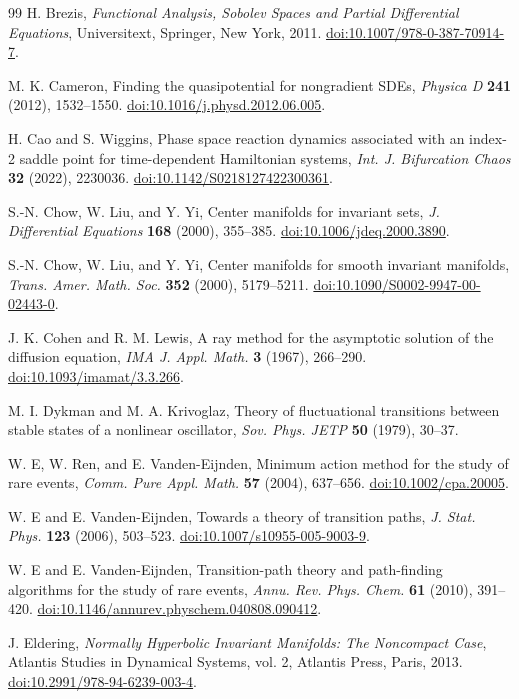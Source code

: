 \documentclass[11pt]{article}
\theoremstyle{definition}
\theoremstyle{remark}
\newcommand{\doi}[1]{\href{https://doi.org/#1}{doi:#1}}
\begin{document}
\begin{thebibliography}{99}
H. Brezis,
\emph{Functional Analysis, Sobolev Spaces and Partial Differential Equations},
Universitext, Springer, New York, 2011.
\doi{10.1007/978-0-387-70914-7}.

M. K. Cameron,
Finding the quasipotential for nongradient SDEs,
\emph{Physica D} \textbf{241} (2012), 1532--1550.
\doi{10.1016/j.physd.2012.06.005}.

H. Cao and S. Wiggins,
Phase space reaction dynamics associated with an index-2 saddle point for time-dependent Hamiltonian systems,
\emph{Int. J. Bifurcation Chaos} \textbf{32} (2022), 2230036.
\doi{10.1142/S0218127422300361}.

S.-N. Chow, W. Liu, and Y. Yi,
Center manifolds for invariant sets,
\emph{J. Differential Equations} \textbf{168} (2000), 355--385.
\doi{10.1006/jdeq.2000.3890}.

S.-N. Chow, W. Liu, and Y. Yi,
Center manifolds for smooth invariant manifolds,
\emph{Trans. Amer. Math. Soc.} \textbf{352} (2000), 5179--5211.
\doi{10.1090/S0002-9947-00-02443-0}.

J. K. Cohen and R. M. Lewis,
A ray method for the asymptotic solution of the diffusion equation,
\emph{IMA J. Appl. Math.} \textbf{3} (1967), 266--290.
\doi{10.1093/imamat/3.3.266}.

M. I. Dykman and M. A. Krivoglaz,
Theory of fluctuational transitions between stable states of a nonlinear oscillator,
\emph{Sov. Phys. JETP} \textbf{50} (1979), 30--37.

W. E, W. Ren, and E. Vanden-Eijnden,
Minimum action method for the study of rare events,
\emph{Comm. Pure Appl. Math.} \textbf{57} (2004), 637--656.
\doi{10.1002/cpa.20005}.

W. E and E. Vanden-Eijnden,
Towards a theory of transition paths,
\emph{J. Stat. Phys.} \textbf{123} (2006), 503--523.
\doi{10.1007/s10955-005-9003-9}.

W. E and E. Vanden-Eijnden,
Transition-path theory and path-finding algorithms for the study of rare events,
\emph{Annu. Rev. Phys. Chem.} \textbf{61} (2010), 391--420.
\doi{10.1146/annurev.physchem.040808.090412}.

J. Eldering,
\emph{Normally Hyperbolic Invariant Manifolds: The Noncompact Case},
Atlantis Studies in Dynamical Systems, vol. 2, Atlantis Press, Paris, 2013.
\doi{10.2991/978-94-6239-003-4}.


\end{thebibliography}
\end{document}
